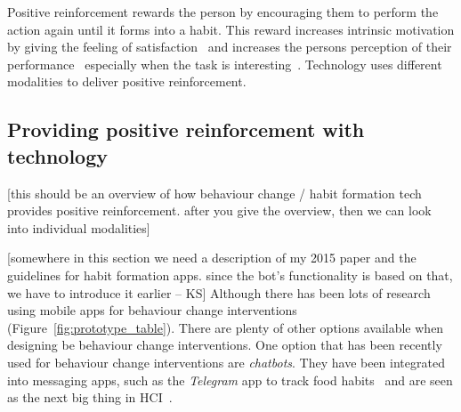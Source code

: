 \documentclass{scaffold/sigchi}
\begin{document}
Positive reinforcement rewards the person by encouraging them to perform the action again until it forms into a habit. This reward increases intrinsic motivation by giving the feeling of satisfaction~\cite{article_promoting_habit_formation} and increases the persons perception of their performance~\cite{positive_reinforcement_pro} especially when the task is interesting~\cite{article_meta_analytic_review_intrinsic_motivation}. Technology uses different modalities to deliver positive reinforcement.

\subsection{Providing positive reinforcement with technology}
[this should be an overview of how behaviour change / habit formation tech provides positive reinforcement. after you give the overview, then we can look into individual modalities]

[somewhere in this section we need a description of my 2015 paper and the guidelines for habit formation apps. since the bot's functionality is based on that, we have to introduce it earlier -- KS]
Although there has been lots of research using mobile apps for behaviour change interventions~\cite{survey_on_current_apps_of_steel} (Figure~\ref{fig:prototype_table}). There are plenty of other options available when designing be behaviour change interventions. One option that has been recently used for behaviour change interventions are \textit{chatbots}. They have been integrated into messaging apps, such as the \textit{Telegram} app to track food habits~\cite{telegram_bot_tracking_habits} and are seen as the next big thing in HCI~\cite{chatbots_and_new_world_of_hci}.
\end{document}
